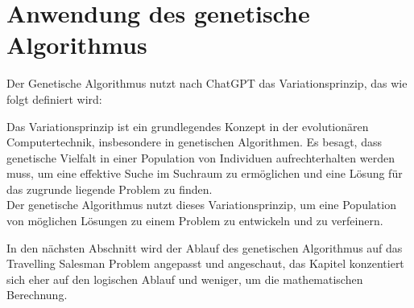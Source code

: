 %
%
%
%
\section{Anwendung des genetische Algorithmus
\label{buch:paper:varalg:section:genetic_algorithm_process}}
Der Genetische Algorithmus nutzt nach ChatGPT das Variationsprinzip, 
das wie folgt definiert wird:

\begin{displayquote}
Das Variationsprinzip ist ein grundlegendes Konzept in der 
evolutionären Computertechnik, insbesondere in genetischen 
Algorithmen. Es besagt, dass genetische Vielfalt in einer 
Population von Individuen aufrechterhalten werden muss, 
um eine effektive Suche im Suchraum zu ermöglichen und eine 
Lösung für das zugrunde liegende Problem zu finden.
\\
Der genetische Algorithmus nutzt dieses Variationsprinzip, um eine 
Population von möglichen Lösungen zu einem Problem zu entwickeln 
und zu verfeinern\cite{chatgpt2024}.
\end{displayquote}

In den nächsten Abschnitt wird der Ablauf des genetischen Algorithmus 
auf das Travelling Salesman Problem angepasst und angeschaut, das Kapitel
konzentiert sich eher auf den logischen Ablauf und weniger, um die 
mathematischen Berechnung.









